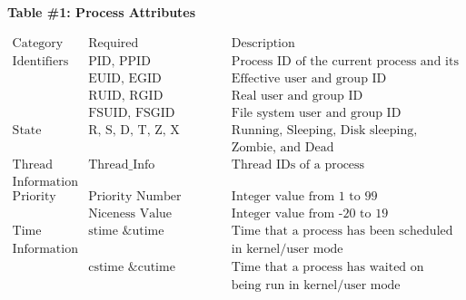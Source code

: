 \documentclass[12pt]{extarticle}
\begin{document}
\begin{center}
    \textbf{Table \#1: Process Attributes}
\end{center}
\begin{displaymath}
    \begin{array}{|l|l|l|}
    \hline
    \text{Category} & \text{Required Variables/Items} & \text{Description} \\ 
    \hline
        \text{Identifiers} & \text{PID, PPID}    & \text{Process ID of the current process and its parent} \\
        \hspace{1cm}       & \text{EUID, EGID}   & \text{Effective user and group ID} \\
        \hspace{1cm}       & \text{RUID, RGID}   & \text{Real user and group ID} \\
        \hspace{1cm}       & \text{FSUID, FSGID} & \text{File system user and group ID} \\
    \hline
        \text{State}       & \text{R, S, D, T, Z, X} & \text{Running, Sleeping, Disk sleeping, Stopped,} \\ \hspace{1cm}       & \hspace{1cm}            & \text{Zombie, and Dead} \\
    \hline
        \text{Thread }     & \text{Thread\_Info} & \text{Thread IDs of a process} \\
        \text{Information} & \hspace{1cm}        & \hspace{1cm}\\
    \hline
        \text{Priority}    & \text{Priority Number} & \text{Integer value from 1 to 99} \\
        \hspace{1cm}       & \text{Niceness Value}  & \text{Integer value from -20 to 19} \\
    \hline
        \text{Time}        & \text{stime \& utime}  & \text{Time that a process has been scheduled} \\
        \text{Information} & \hspace{1cm}           & \text{in kernel/user mode} \\
        \hspace{1cm}       & \text{cstime \& cutime} & \text{Time that a process has waited on children}\\
        \hspace{1cm}       & \hspace{1cm}            & \text{being run in kernel/user mode} \\

\end{array}
\end{displaymath}
\end{document}
